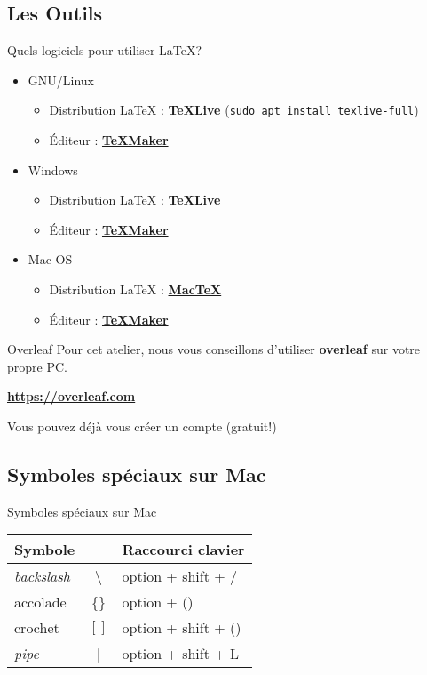 \subsection{Les Outils}

\begin{frame}{\Warning Quels logiciels pour utiliser \LaTeX{}?}
  \begin{itemize}
      \item GNU/Linux
      \begin{itemize}
          \item Distribution \LaTeX{} : \textbf{TeXLive}
          {\tiny (\lstinline|sudo apt install texlive-full|)}
        \item Éditeur : \textbf{\href{http://www.xm1math.net/texmaker/}{TeXMaker}}
      \end{itemize}
      \item Windows
      \begin{itemize}
        \item Distribution \LaTeX{} : \textbf{TeXLive}
        \item Éditeur : \textbf{\href{http://www.xm1math.net/texmaker/}{TeXMaker}}
      \end{itemize}
      \item Mac OS
      \begin{itemize}
        \item Distribution \LaTeX{} : \textbf{\href{https://www.tug.org/mactex/}{MacTeX}}
        \item Éditeur : \textbf{\href{http://www.xm1math.net/texmaker/}{TeXMaker}}
      \end{itemize}
    \end{itemize}
\end{frame}

\begin{frame}{Overleaf}
  Pour cet atelier, nous vous conseillons d'utiliser \textbf{overleaf} sur votre propre PC.
  \begin{center}
    \textbf{\url{https://overleaf.com}}
  \end{center}
  Vous pouvez déjà vous créer un compte (gratuit!)
\end{frame}
\subsection{Symboles spéciaux sur Mac}

\begin{frame}{Symboles spéciaux sur Mac}
  \begin{center}
    \begin{tabular}{|lc|l|}
      \hline
      Symbole & & Raccourci clavier \\\hline
      \textit{backslash} & \textbackslash & option + shift + / \\
      accolade & \{\} & option + () \\
      crochet & $[]$ & option + shift + () \\
      \textit{pipe} & | & option + shift + L \\
      \hline
    \end{tabular}
  \end{center}
\end{frame}

